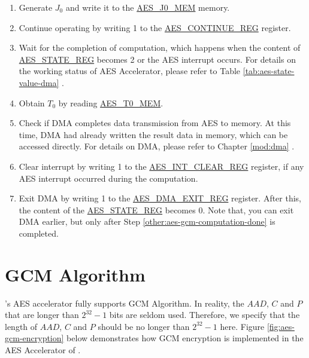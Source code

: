 \documentclass[main\_\_EN.tex]{subfiles}
\begin{document}
\begin{enumerate}
    \item Generate $J_0$ and write it to the \hyperref[memdesc:AESJ0MEM]{AES\_J0\_MEM} memory.
    \item Continue operating by writing 1 to the \hyperref[regdesc:AESCONTINUEREG]{AES\_CONTINUE\_REG} register.
    \item \label{other:aes-gcm-computation-done} Wait for the completion of computation, which happens when the content of \hyperref[regdesc:AESSTATEREG]{AES\_STATE\_REG} becomes 2 or the AES interrupt occurs. For details on the working status of AES Accelerator, please refer to Table \ref{tab:aes-state-value-dma} \textit{}.
    \item Obtain $T_0$ by reading \hyperref[memdesc:AEST0MEM]{AES\_T0\_MEM}.
    \item Check if DMA completes data transmission from AES to memory. At this time, DMA had already written the result data in memory, which can be accessed directly. For details on DMA, please refer to Chapter \ref{mod:dma} \textit{}.
    \item Clear interrupt by writing 1 to the \hyperref[regdesc:AESINTCLEARREG]{AES\_INT\_CLEAR\_REG} register, if any AES interrupt occurred during the computation.
    \item Exit DMA by writing 1 to the \hyperref[regdesc:AESDMAEXITREG]{AES\_DMA\_EXIT\_REG} register. After this, the content of the \hyperref[regdesc:AESSTATEREG]{AES\_STATE\_REG} becomes 0. Note that, you can exit DMA earlier, but only after Step \ref{other:aes-gcm-computation-done} is completed.
\end{enumerate}


\section{GCM Algorithm}\label{sec:aes-gcm-algorithm}

\chipname{}'s AES accelerator fully supports GCM Algorithm. In reality, the \begin{math}AAD\end{math}, \begin{math}C\end{math} and \begin{math}P\end{math} that are longer than \begin{math}2^{32}-1\end{math} bits are seldom used. Therefore, we specify that the length of \begin{math}AAD\end{math}, \begin{math}C\end{math} and \begin{math}P\end{math} should be no longer than \begin{math}2^{32}-1\end{math} here.
Figure \ref{fig:aes-gcm-encryption} below demonstrates how GCM encryption is implemented in the AES Accelerator of \chipname{}.
\end{document}
